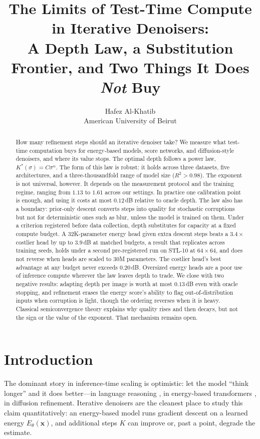 \documentclass[letterpaper]{article}
\title{The Limits of Test-Time Compute in Iterative Denoisers:\\
A Depth Law, a Substitution Frontier, and Two Things It Does \emph{Not} Buy}
\author{Hafez Al-Khatib \\ American University of Beirut}
\date{}
\begin{document}
\maketitle

\begin{abstract}
How many refinement steps should an iterative denoiser take? We measure what test-time computation buys
for energy-based models, score networks, and diffusion-style denoisers, and where its value stops. The
optimal depth follows a power law, $K^{*}(\sigma)=C\sigma^{\alpha}$. The form of this law is robust: it
holds across three datasets, five architectures, and a three-thousandfold range of model size
($R^{2}>0.98$). The exponent is not universal, however. It depends on the measurement protocol and the
training regime, ranging from $1.13$ to $1.61$ across our settings. In practice one calibration point is
enough, and using it costs at most $0.12$\,dB relative to oracle depth. The law also has a boundary:
prior-only descent converts steps into quality for stochastic corruptions but not for deterministic ones
such as blur, unless the model is trained on them. Under a criterion registered before data collection,
depth substitutes for capacity at a fixed compute budget. A 32K-parameter energy head given extra descent
steps beats a $3.4\times$ costlier head by up to $3.9$\,dB at matched budgets, a result that replicates
across training seeds, holds under a second pre-registered run on STL-10 at $64\times64$, and does not
reverse when heads are scaled to 30M parameters. The costlier head's best advantage at any budget never
exceeds $0.20$\,dB. Oversized energy heads are a poor use of inference
compute wherever the law leaves depth to trade. We close with two negative results: adapting depth per
image is worth at most $0.13$\,dB even with oracle stopping, and refinement erases the energy score's
ability to flag out-of-distribution inputs when corruption is light, though the ordering reverses when
it is heavy.
Classical semiconvergence theory explains why quality rises and then decays, but not the sign or the
value of the exponent. That mechanism remains open.
\end{abstract}

\section{Introduction}
The dominant story in inference-time scaling is optimistic: let the model ``think longer'' and it does
better---in language reasoning \citep{snell2024}, in energy-based transformers \citep{gladstone2025}, in
diffusion refinement. Iterative denoisers are the cleanest place to study this claim quantitatively: an
energy-based model runs gradient descent on a learned energy $E_\theta(\mathbf{x})$, and additional steps
$K$ can improve or, past a point, degrade the estimate.
\end{document}
